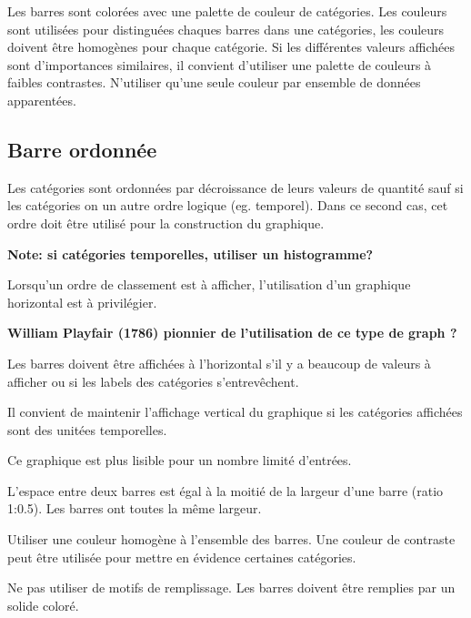 \documentclass[a4paper,12pt]{article}
\begin{document}
\begin{multicols}{2}
Les barres sont colorées avec une palette de couleur de catégories. Les couleurs sont utilisées pour distinguées chaques barres dans une catégories, les couleurs doivent être homogènes pour chaque catégorie. Si les différentes valeurs affichées sont d'importances similaires, il convient d'utiliser une palette de couleurs à faibles contrastes. N'utiliser qu'une seule couleur par ensemble de données apparentées. \autocite{stephenfewComponentlevelGraphDesign2012}
\subsection*{Barre ordonnée}
\label{sec:orgaba5c7a}
Les catégories sont ordonnées par décroissance de leurs valeurs de quantité\autocite{jonathanschwabishComparingCategories2021} sauf si les catégories on un autre ordre logique (eg. temporel). Dans ce second cas, cet ordre doit être utilisé pour la construction du graphique. \autocite{wilkeVisualizingAmounts2019}

\textbf{Note: si catégories temporelles, utiliser un histogramme?}

Lorsqu'un ordre de classement est à afficher, l'utilisation d'un graphique horizontal est à privilégier. \autocite{andreaskrauseBestPracticesData2024}

\textbf{William Playfair (1786) pionnier de l'utilisation de ce type de graph ?}

Les barres doivent être affichées à l'horizontal s'il y a beaucoup de valeurs à afficher ou si les labels des catégories s'entrevêchent. \autocite{alansmithLexiqueVisuel,sosulskiGraphics2019,wilkeVisualizingAmounts2019,stephenfewComponentlevelGraphDesign2012,jonathanschwabishComparingCategories2021}

Il convient de maintenir l'affichage vertical du graphique si les catégories affichées sont des unitées temporelles. \autocite{stephenfewComponentlevelGraphDesign2012}

Ce graphique est plus lisible pour un nombre limité d'entrées. \autocite{mikeyiHowChooseRight2020}

L'espace entre deux barres est égal à la moitié de la largeur d'une barre (ratio 1:0.5). Les barres ont toutes la même largeur. \autocite{stephenfewComponentlevelGraphDesign2012}

Utiliser une couleur homogène à l'ensemble des barres. Une couleur de contraste peut être utilisée pour mettre en évidence certaines catégories.

Ne pas utiliser de motifs de remplissage. Les barres doivent être remplies par un solide coloré. \autocite{stephenfewComponentlevelGraphDesign2012}


\end{multicols}
\end{document}
